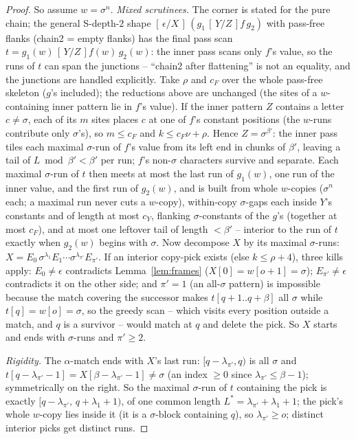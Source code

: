 \begin{proof}
    So assume $w = \sigma^{n}$.  \emph{Mixed scrutinees.}  The corner
    is stated for the pure chain; the general S-depth-$2$ shape
    $[\,\epsilon/X\,]\,(g_1\,[\,Y/Z\,]f\,g_2)$ with pass-free flanks
    (chain2 = empty flanks) has the final pass scan
    $t = g_1(w)\,[\,Y/Z\,]f(w)\,g_2(w)$: the inner pass scans only
    $f$'s value, so the runs of $t$ can span the junctions --
    ``chain2 after flattening'' is not an equality, and the junctions
    are handled explicitly.  Take $\rho$ and $c_F$ over the whole
    pass-free skeleton ($g$'s included); the reductions above are
    unchanged (the sites of a $w$-containing inner pattern lie in
    $f$'s value).  If the inner pattern $Z$ contains a
    letter $c \neq \sigma$, each of its $m$ sites places $c$ at one
    of $f$'s constant positions (the $w$-runs contribute only
    $\sigma$'s), so $m \leq c_F$ and $k \leq c_F \nu + \rho$.  Hence
    $Z = \sigma^{\beta'}$: the inner pass tiles each maximal
    $\sigma$-run of $f$'s value from its left end in chunks of
    $\beta'$, leaving a tail of $L \bmod \beta' < \beta'$ per run;
    $f$'s non-$\sigma$ characters survive and separate.  Each maximal
    $\sigma$-run of $t$ then meets at most the last run of $g_1(w)$,
    one run of the inner value, and the first run of $g_2(w)$, and is
    built from whole $w$-copies ($\sigma^{n}$ each; a maximal run
    never cuts a $w$-copy), within-copy $\sigma$-gaps each inside
    $Y$'s constants and of length at most $c_Y$, flanking
    $\sigma$-constants of the $g$'s (together at most $c_F$), and at
    most one leftover tail of length $< \beta'$ -- interior to the
    run of $t$ exactly when $g_2(w)$ begins with $\sigma$.  Now
    decompose $X$ by its maximal $\sigma$-runs:
    $X = E_0\, \sigma^{\lambda_1} E_1 \cdots
    \sigma^{\lambda_{\pi'}} E_{\pi'}$.  If an interior copy-pick
    exists (else $k \leq \rho + 4$), three kills apply:
    $E_0 \neq \epsilon$ contradicts Lemma~\ref{lem:frames}
    ($X[0] = w[o+1] = \sigma$); $E_{\pi'} \neq \epsilon$ contradicts
    it on the other side; and $\pi' = 1$ (an all-$\sigma$ pattern) is
    impossible because the match covering the successor makes
    $t[q+1..q+\beta]$ all $\sigma$ while $t[q] = w[o] = \sigma$, so
    the greedy scan -- which visits every position outside a match,
    and $q$ is a survivor -- would match at $q$ and delete the pick.
    So $X$ starts and ends with $\sigma$-runs and $\pi' \geq 2$.

    \emph{Rigidity.}  The $\alpha$-match ends with $X$'s last run:
    $[q - \lambda_{\pi'}, q)$ is all $\sigma$ and
    $t[q-\lambda_{\pi'}-1] = X[\beta - \lambda_{\pi'} - 1] \neq
    \sigma$ (an index $\geq 0$ since $\lambda_{\pi'} \leq \beta-1$);
    symmetrically on the right.  So the maximal $\sigma$-run of $t$
    containing the pick is exactly $[q - \lambda_{\pi'},\, q +
    \lambda_1 + 1)$, of one common length $L^{*} = \lambda_{\pi'} +
    \lambda_1 + 1$; the pick's whole $w$-copy lies inside it (it is a
    $\sigma$-block containing $q$), so $\lambda_{\pi'} \geq o$;
    distinct interior picks get distinct runs.


\end{proof}
